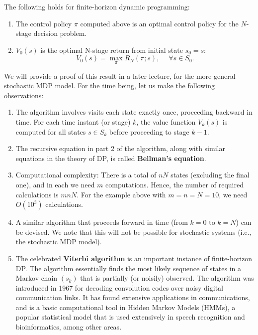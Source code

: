 \begin{proposition}
The following holds for finite-horizon dynamic programming:
\begin{enumerate}
  \item The control policy $\pi $ computed above is an optimal control policy for the $N$-stage decision problem.
  \item $V_0^{}(s)$ is the optimal N-stage return from initial state ${s_0} = s$:
\[{V_0}(s) = \mathop {\max }\limits_\pi  {R_N}(\pi ;s),\;\quad \forall s \in {S_0}.\]
\end{enumerate}
\end{proposition}

We will provide a proof of this result in a later lecture, for the more general stochastic MDP model. For the time being, let us make the following observations:
\begin{enumerate}
  \item The algorithm involves visits each state exactly once, proceeding backward in time. For each time instant (or stage) $k$, the value function ${V_k}(s)$ is computed for all states $s \in {S_k}$ before proceeding to stage $k - 1$.
  \item The recursive equation in part 2 of the algorithm, along with similar equations in the theory of DP, is called \textbf{Bellman's equation}.
  \item Computational complexity: There is a total of $nN$ states (excluding the final one), and in each we need $m$ computations. Hence, the number of required calculations is $mnN$.
For the example above with $m = n = N = 10$, we need $O({10^3})$ calculations.
  \item A similar algorithm that proceeds forward in time (from $k = 0$ to $k = N$) can be devised. We note that this will not be possible for stochastic systems (i.e., the stochastic MDP model).
  \item The celebrated \textbf{Viterbi algorithm} is an important instance of finite-horizon DP. The algorithm essentially finds the most likely sequence of states in a Markov chain $({s_k})$ that is partially (or noisily) observed.
The algorithm was introduced in 1967 for decoding convolution codes over noisy digital communication links. It has found extensive applications in communications, and is a basic computational tool in Hidden Markov Models (HMMs), a popular statistical model that is used extensively in speech recognition and bioinformatics, among other areas.
\end{enumerate}

